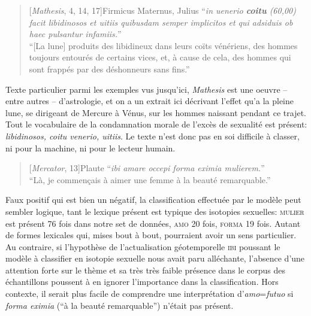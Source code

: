 \starbreak

\begin{quote}[\textit{Mathesis}, 4, 14, 17]{Firmicus Maternus, Julius}
    \enquote{\textit{in uenerio \textbf{coitu} (60,00) facit libidinosos et uitiis quibusdam semper implicitos et qui adsiduis ob haec pulsantur infamiis.}} \\
    \enquote{[La lune] produits des libidineux dans leurs coïts vénériens, des hommes toujours entourés de certains vices, et, à cause de cela, des hommes qui sont frappés par des déshonneurs sans fins.}
\end{quote}

Texte particulier parmi les exemples vus jusqu'ici, \textit{Mathesis} est une oeuvre -- entre autres -- d'astrologie, et on a un extrait ici décrivant l'effet qu'a la pleine lune, se dirigeant de Mercure à Vénus, sur les hommes naissant pendant ce trajet. Tout le vocabulaire de la condamnation morale de l'excès de sexualité est présent: \textit{libidinosos, coitu venerio, uitiis}. %
Le texte n'est donc pas en soi difficile à classer, ni pour la machine, ni pour le lecteur humain.

\starbreak

\begin{quote}[\textit{Mercator}, 13]{Plaute}
    \enquote{\textit{ibi amare occepi forma eximia mulierem.}} \\
    \enquote{Là, je commençais à aimer une femme à la beauté remarquable.}
\end{quote}

Faux positif qui est bien un négatif, la classification effectuée par le modèle peut sembler logique, tant le lexique présent est typique des isotopies sexuelles: \textsc{mulier} est présent 76 fois dans notre set de données, \textsc{amo} 20 fois, \textsc{forma} 19 fois. Autant de formes lexicales qui, mises bout à bout, pourraient avoir un sens particulier. Au contraire, si l'hypothèse de l'actualisation géotemporelle \textsc{ibi} poussant le modèle à classifier en isotopie sexuelle nous avait paru alléchante, l'absence d'une attention forte sur le thème et sa très très faible présence dans le corpus des échantillons poussent à en ignorer l'importance dans la classification. Hors contexte, il serait plus facile de comprendre une interprétation d'\textit{amo}=\textit{futuo} si \textit{forma eximia} (\enquote{à la beauté remarquable}) n'était pas présent.

